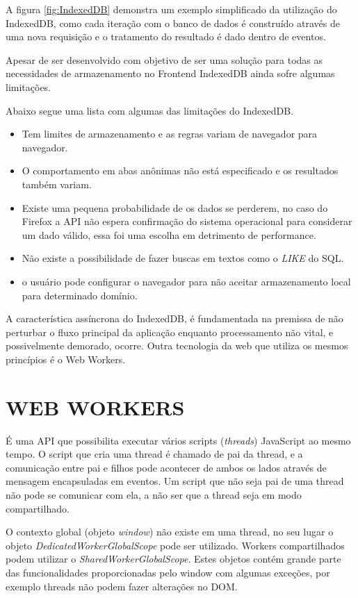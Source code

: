 A figura \ref{fig:IndexedDB} demonstra um exemplo simplificado da
utilização do IndexedDB, como cada iteração com o banco de dados é
construído através de uma nova requisição e o tratamento do resultado
é dado dentro de eventos.

Apesar de ser desenvolvido com objetivo de ser uma solução para todas
as necessidades de armazenamento no Frontend IndexedDB ainda sofre
algumas limitações.

Abaixo segue uma lista com algumas das limitações do IndexedDB.

\begin{itemize}
\item Tem limites de armazenamento e as regras variam de navegador para navegador.
\item O comportamento em abas anônimas não está especificado e os resultados também variam.
\item Existe uma pequena probabilidade de os dados se perderem, no caso do Firefox a API não espera confirmação do sistema operacional para considerar um dado válido, essa foi uma escolha em detrimento de performance.
\item Não existe a possibilidade de fazer buscas em textos como o \textit{LIKE} do SQL.
\item o usuário pode configurar o navegador para não aceitar armazenamento local para determinado domínio.
\end{itemize}


A característica assíncrona do IndexedDB, é fundamentada na
premissa de não perturbar o fluxo principal da aplicação enquanto
processamento não vital, e possivelmente demorado, ocorre. Outra
tecnologia da web que utiliza os mesmos princípios é o Web Workers.

\section{WEB WORKERS}

É uma API que possibilita executar vários scripts
(\textit{threads}) JavaScript ao mesmo tempo. O script que cria uma
thread é chamado de pai da thread, e a comunicação entre pai e filhos
pode acontecer de ambos os lados através de mensagem encapsuladas
em eventos. Um script que não seja pai de uma thread não pode se
comunicar com ela, a não ser que a thread seja em modo compartilhado.

O contexto global (objeto \textit{window}) não existe em uma
thread, no seu lugar o objeto \textit{DedicatedWorkerGlobalScope}
pode ser utilizado. Workers compartilhados podem utilizar o
\textit{SharedWorkerGlobalScope}. Estes objetos contém grande parte das
funcionalidades proporcionadas pelo window com algumas exceções, por
exemplo threads não podem fazer alterações no DOM.

